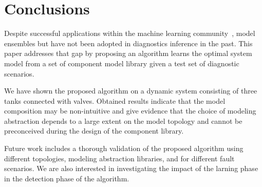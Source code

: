 \section{Conclusions}\label{sec:conclusions}
%
Despite successful applications within the machine learning community~\citep{brown2010ensemble,dietterich2000ensemble},
model ensembles but have not been adopted in diagnostics inference in the past. This paper addresses that gap by proposing
an algorithm learns the optimal system model from a set of component model library given a test set of diagnostic scenarios.

We have shown the proposed algorithm on a dynamic system consisting of three tanks connected with valves. Obtained results
indicate that the model composition may be non-intuitive and give evidence that the choice of modeling abstraction depends
to a large extent on the model topology and cannot be preconceived during the design of the component library.

Future work includes a thorough validation of the proposed algorithm using different topologies, modeling abstraction
libraries, and for different fault scenarios. We are also interested in investigating the impact of the larning phase
in the detection phase of the algorithm.
